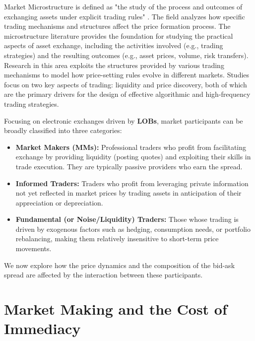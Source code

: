

Market Microstructure is defined as "the study of the process and outcomes of exchanging assets under explicit trading rules" \cite{ohara1997}. The field analyzes how specific trading mechanisms and structures affect the price formation process. The microstructure literature provides the foundation for studying the practical aspects of asset exchange, including the activities involved (e.g., trading strategies) and the resulting outcomes (e.g., asset prices, volume, risk transfers). Research in this area exploits the structures provided by various trading mechanisms to model how price-setting rules evolve in different markets. Studies focus on two key aspects of trading: liquidity and price discovery, both of which are the primary drivers for the design of effective algorithmic and high-frequency trading strategies.

Focusing on electronic exchanges driven by \textbf{LOBs}, market participants can be broadly classified into three categories:
\begin{itemize}
    \item \textbf{Market Makers (MMs):} Professional traders who profit from facilitating exchange by providing liquidity (posting quotes) and exploiting their skills in trade execution. They are typically passive providers who earn the spread.
    \item \textbf{Informed Traders:} Traders who profit from leveraging private information not yet reflected in market prices by trading assets in anticipation of their appreciation or depreciation.
    \item \textbf{Fundamental (or Noise/Liquidity) Traders:} Those whose trading is driven by exogenous factors such as hedging, consumption needs, or portfolio rebalancing, making them relatively insensitive to short-term price movements.
\end{itemize}
We now explore how the price dynamics and the composition of the bid-ask spread are affected by the interaction between these participants.

\section{Market Making and the Cost of Immediacy}
\label{sec:market-making}

